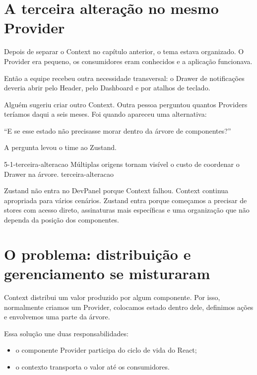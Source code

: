 \label{chap:conhecendo-zustand}

\section{A terceira alteração no mesmo Provider}

\begin{historia}
Depois de separar o Context no capítulo anterior, o tema estava organizado. O
Provider era pequeno, os consumidores eram conhecidos e a aplicação funcionava.

Então a equipe recebeu outra necessidade transversal: o Drawer de notificações
deveria abrir pelo Header, pelo Dashboard e por atalhos de teclado.

Alguém sugeriu criar outro Context. Outra pessoa perguntou quantos Providers
teríamos daqui a seis meses. Foi quando apareceu uma alternativa:

``E se esse estado não precisasse morar dentro da árvore de componentes?''

A pergunta levou o time ao Zustand.
\end{historia}

\imagemcapitulo
  {5-1-terceira-alteracao}
  {Múltiplas origens tornam visível o custo de coordenar o Drawer na árvore.}
  {terceira-alteracao}

Zustand não entra no DevPanel porque Context falhou. Context continua apropriada
para vários cenários. Zustand entra porque começamos a precisar de stores com
acesso direto, assinaturas mais específicas e uma organização que não dependa da
posição dos componentes.

\section{O problema: distribuição e gerenciamento se misturaram}

Context distribui um valor produzido por algum componente. Por isso, normalmente
criamos um Provider, colocamos estado dentro dele, definimos ações e envolvemos
uma parte da árvore.

Essa solução une duas responsabilidades:

\begin{itemize}
  \item o componente Provider participa do ciclo de vida do React;
  \item o contexto transporta o valor até os consumidores.
\end{itemize}


